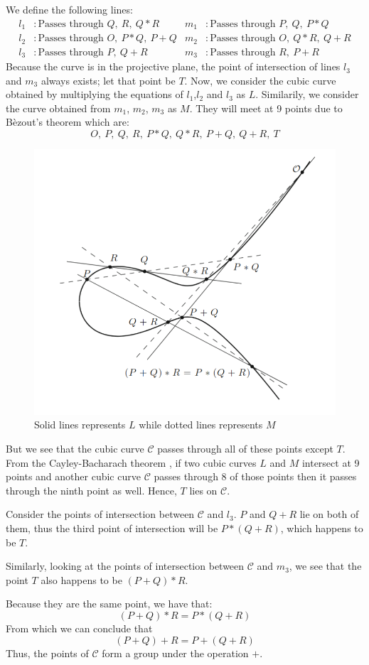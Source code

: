 We define the following lines:
\begin{align*}
  l_1 &\colon \text{Passes through }Q,\ R,\ Q*R   & m_1 &\colon \text{Passes through }P,\ Q,\ P*Q \\
  l_2 &\colon \text{Passes through }O,\ P*Q,\ P+Q & m_2 &\colon \text{Passes through }O,\ Q*R,\ Q+R \\
  l_3 &\colon \text{Passes through }P,\ Q+R       & m_3 &\colon \text{Passes through }R,\ P+R
\end{align*}
Because the curve is in the projective plane, the point of intersection of lines $l_3$ and $m_3$ always exists; let that point be $T$.
Now, we consider the cubic curve obtained by multiplying the equations of $l_1$,$l_2$ and $l_3$ as $L$.
Similarily, we consider the curve obtained from $m_1$, $m_2$, $m_3$ as $M$.
They will  meet at 9 points due to B\`ezout's theorem \cite[Thm.~A.1]{silver} which are:
\[O,\ P,\ Q,\ R,\ P*Q,\ Q*R,\ P+Q,\ Q+R,\ T\]
\begin{figure}[H]
  \centering
  \includegraphics[width=0.7\linewidth]{pictures/Associativity.png}
  \caption{Solid lines represents $L$ while dotted lines represents $M$}
\end{figure}
But we see that the cubic curve $\mathcal{C}$ passes through all of these points except $T$.
From the Cayley-Bacharach theorem \cite[Thm.~A.3]{silver}, if two cubic curves $L$ and $M$ intersect at 9 points and another cubic curve $\mathcal{C}$ passes through 8 of those points then it passes through the ninth point as well.
Hence, $T$ lies on $\mathcal{C}$.

\vspace{1ex}

\noindent
Consider the points of intersection between $\mathcal{C}$ and $l_3$.
$P$ and $Q+R$ lie on both of them, thus the third point of intersection will be $P*(Q+R)$, which happens to be $T$.

\vspace{1ex}

Similarly, looking at the points of intersection between $\mathcal{C}$ and $m_3$, we see that the point $T$ also happens to be $(P+Q)*R$.

\vspace{1ex}

\noindent
Because they are the same point, we have that:
\[(P+Q)*R = P*(Q+R)\]
From which we can conclude that
\[(P+Q)+R = P+(Q+R)\]
Thus, the points of $\mathcal{C}$ form a group under the operation $+$.
